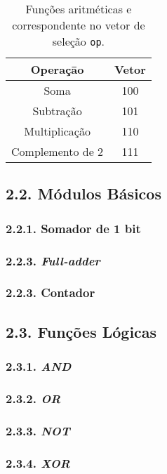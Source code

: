 \begin{table}[h]
    \centering
    \begin{tabular}{|c|c|}
     \hline \textbf{Operaçāo} & \textbf{Vetor} \\
     \hline Soma & 100\\
     \hline Subtração & 101\\
     \hline Multiplicação & 110\\
     \hline Complemento de 2 & 111\\
    \hline

\end{tabular}
    \caption{Funções aritméticas e correspondente no vetor de seleção \texttt{op}.}
    \label{tab:t2}
\end{table}

\subsection*{2.2. Módulos Básicos}

\subsubsection*{2.2.1. Somador de 1 bit}

\subsubsection*{2.2.3. \textit{Full-adder}}

\subsubsection*{2.2.3. Contador}

\subsection*{2.3. Funções Lógicas}
\subsubsection*{2.3.1. \textit{AND}}
\subsubsection*{2.3.2. \textit{OR}}
\subsubsection*{2.3.3. \textit{NOT}}
\subsubsection*{2.3.4. \textit{XOR}}

